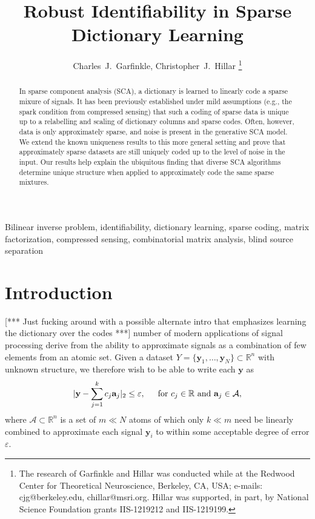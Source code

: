 \documentclass[journal, onecolumn]{IEEEtran}
\begin{document}
\title{Robust Identifiability in Sparse Dictionary Learning}

\author{Charles~J.~Garfinkle,  Christopher~J.~Hillar%
\thanks{The research of Garfinkle and Hillar was conducted while at the Redwood Center for Theoretical Neuroscience, Berkeley, CA, USA; e-mails: cjg@berkeley.edu, chillar@msri.org.  Hillar was supported, in part, by National Science Foundation grants IIS-1219212 and IIS-1219199.}}%

\maketitle

\begin{abstract}
In sparse component analysis (SCA), a dictionary is learned to linearly code a sparse mixure of signals.  It has been previously established  under mild assumptions (e.g., the spark condition from compressed sensing) that such a coding of sparse data is unique up to a relabelling and scaling of dictionary columns and sparse codes.  Often, however, data is only approximately sparse, and noise is present in the generative SCA model.  We extend the known uniqueness results to this more general setting and prove that approximately sparse datasets are still uniquely coded up to the level of noise in the input.  Our results help explain the ubiquitous finding that diverse SCA algorithms determine unique structure when applied to approximately code the same sparse mixtures.
\end{abstract}

\begin{IEEEkeywords}
Bilinear inverse problem, identifiability, dictionary learning, sparse coding, matrix factorization, compressed sensing, combinatorial matrix analysis, blind source separation
\end{IEEEkeywords}


\section{Introduction}
[*** Just fucking around with a possible alternate intro that emphasizes learning the dictionary over the codes ***] 
 number of modern applications of signal processing derive from the ability to approximate signals as a combination of few elements from an atomic set. Given a dataset $Y = \{\mathbf{y}_1, \ldots, \mathbf{y}_N\} \subset \mathbb{R}^n$ with unknown structure, we therefore wish to be able to write each $\mathbf{y}$ as
\begin{align}\label{AtomicDecomposition}
|\mathbf{y} - \sum_{j=1}^{k} c_j \mathbf{a}_j|_2 \leq \varepsilon, \indent \text{for } c_j \in \mathbb{R} \text{ and } \mathbf{a}_j \in \mathcal{A},
\end{align}
%
where $\mathcal{A} \subset \mathbb{R}^n$ is a set of $m \ll N$ atoms of which only $k \ll m$ need be linearly combined to approximate each signal $\mathbf{y}_i$ to within some acceptable degree of error $\varepsilon$.
\end{document}
